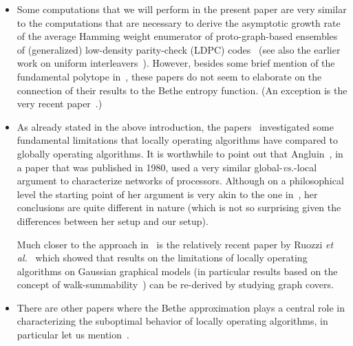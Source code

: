 \documentclass[journal, twocolumn]{IEEEtran}
\newcommand{\etal}{\emph{et al.}}
\newcommand{\versus}{\emph{vs.}}
\newcommand{\?}{\mathrm{?}}
\begin{document}
\begin{itemize}
\item Some computations that we will perform in the present paper are very
  similar to the computations that are necessary to derive the asymptotic
  growth rate of the average Hamming weight enumerator of proto-graph-based
  ensembles of (generalized) low-density parity-check (LDPC)
  codes~\cite{Fogal:McEliece:Thorpe:05:1, Divsalar:Jones:Dolinar:Thorpe:05:1,
    Fu:Anastasopoulos:07:1, Ravazzi:Fagnani:09:1, AbuSurra:Divsalar:Ryan:11:1,
    Flanagan:Paolini:Chiani:Fossorier:11:1, Divsalar:Dolecek:12:1} (see also
  the earlier work on uniform interleavers~\cite{Benedetto:Montorsi:96:1,
    Benedetto:Divsalar:Montorsi:Pollara:98:1}). However, besides some brief
  mention of the fundamental polytope in~\cite{Fogal:McEliece:Thorpe:05:1},
  these papers do not seem to elaborate on the connection of their results to
  the Bethe entropy function. (An exception is the very recent
  paper~\cite{Divsalar:Dolecek:12:1}.)

\item As already stated in the above introduction, the
  papers~\cite{Koetter:Vontobel:03:1, Vontobel:Koetter:05:1:subm} investigated
  some fundamental limitations that locally operating algorithms have compared
  to globally operating algorithms. It is worthwhile to point out that
  Angluin~\cite{Angluin:80:1}, in a paper that was published in 1980, used a
  very similar global-\versus-local argument to characterize networks of
  processors. Although on a philosophical level the starting point of her
  argument is very akin to the one in~\cite{Koetter:Vontobel:03:1,
    Vontobel:Koetter:05:1:subm}, her conclusions are quite different in nature
  (which is not so surprising given the differences between her setup and our
  setup).

  Much closer to the approach in~\cite{Koetter:Vontobel:03:1,
    Vontobel:Koetter:05:1:subm} is the relatively recent paper by Ruozzi
  \etal~\cite{Ruozzi:Thaler:Tatikonda:09:1} which showed that results on the
  limitations of locally operating algorithms on Gaussian graphical models (in
  particular results based on the concept of
  walk-summability~\cite{Malioutov:Johnson:Willsky:06:1}) can be re-derived by
  studying graph covers.

\item There are other papers where the Bethe approximation plays a central
  role in characterizing the suboptimal behavior of locally operating
  algorithms, in particular let us mention~\cite{Mooij:Kappen:05:1,
    Heskes:06:1, Chertkov:Chernyak:06:1, Walsh:Regalia:Johnson:06:1,
    Regalia:Walsh:07:1, Mooij:Kappen:07:1}.


\end{itemize}
\end{document}
